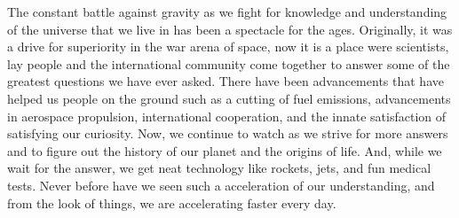 \documentclass[a4paper,12pt]{article}
\begin{document}
The constant battle against gravity as we fight for knowledge and understanding of the universe that we live in has been a spectacle for the ages. Originally, it was a drive for superiority in the war arena of space, now it is a place were scientists, lay people and the international community come together to answer some of the greatest questions we have ever asked. There have been advancements that have helped us people on the ground such as a cutting of fuel emissions, advancements in aerospace propulsion, international cooperation, and the innate satisfaction of satisfying our curiosity. Now, we continue to watch as we strive for more answers and to figure out the history of our planet and the origins of life. And, while we wait for the answer, we get neat technology like rockets, jets, and fun medical tests. Never before have we seen such a acceleration of our understanding, and from the look of things, we are accelerating faster every day. 

\newpage
\printbibliography
\end{document}
